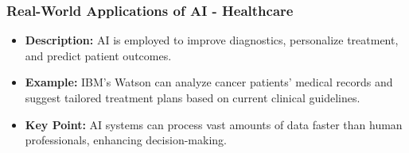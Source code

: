 \documentclass[aspectratio=169]{beamer}
\begin{document}
\begin{frame}[fragile]
    \frametitle{Real-World Applications of AI - Healthcare}
    \begin{itemize}
        \item \textbf{Description:} AI is employed to improve diagnostics, personalize treatment, and predict patient outcomes.
        \item \textbf{Example:} IBM's Watson can analyze cancer patients' medical records and suggest tailored treatment plans based on current clinical guidelines.
        \item \textbf{Key Point:} AI systems can process vast amounts of data faster than human professionals, enhancing decision-making.
    \end{itemize}
\end{frame}
\end{document}
